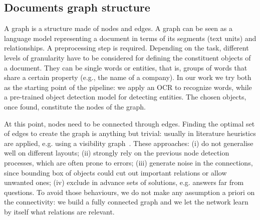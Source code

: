 \documentclass[runningheads]{llncs}
\begin{document}
\subsection{Documents graph structure}
\label{sec:document-graph}
A graph is a structure made of nodes and edges. A graph can be seen as a language model representing a document in terms of its segments (text units) and relationships. A preprocessing step is required. Depending on the task, different levels of granularity have to be considered for defining the constituent objects of a document. They can be single words or entities, that is, groups of words that share a certain property (e.g., the name of a company). In our work we try both as the starting point of the pipeline: we apply an OCR to recognize words, while a pre-trained object detection model for detecting entities.
The chosen objects, once found, constitute the nodes of the graph.

At this point, nodes need to be connected through edges. Finding the optimal set of edges to create the graph is anything but trivial: usually in literature heuristics are applied, e.g. using a visibility graph~\cite{riba2019table}. These approaches: (i) do not generalise well on different layouts; (ii) strongly rely on the previous node detection processes, which are often prone to errors; (iii) generate noise in the connections, since bounding box of objects could cut out important relations or allow unwanted ones; (iv) exclude in advance sets of solutions, e.g. answers far from questions.
To avoid those behaviours, we do not make any assumption a priori on the connectivity: we build a fully connected graph and we let the network learn by itself what relations are relevant.
\end{document}
